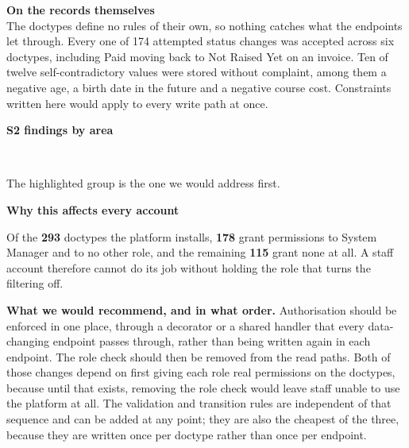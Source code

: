 \documentclass[10pt,a4paper]{article}
\newcommand{\display}{\sffamily}
\newcommand{\code}[1]{{\ttfamily #1}}
\begin{document}
\begin{minipage}[t]{0.55\textwidth}
{\display\small\bfseries\color{accent}On the records themselves}\\[0.15em]
The doctypes define no rules of their own, so nothing catches what the endpoints let through. Every
one of 174 attempted status changes was accepted across six doctypes, including \code{Paid} moving
back to \code{Not Raised Yet} on an invoice. Ten of twelve self-contradictory values were stored
without complaint, among them a negative age, a birth date in the future and a negative course cost.
Constraints written here would apply to every write path at once.
\end{minipage}\hfill
\begin{minipage}[t]{0.41\textwidth}
\vspace{0pt}
{\display\footnotesize\bfseries\color{accent}S2 findings by area}\\[0.35em]
\\[0.6em]
{\scriptsize\color{muted}The highlighted group is the one we would address first.\par}
\vspace{0.5em}
{\display\footnotesize\bfseries\color{accent}Why this affects every account}\\[0.25em]
{\scriptsize Of the \textbf{293} doctypes the platform installs, \textbf{178} grant permissions to
\code{System Manager} and to no other role, and the remaining \textbf{115} grant none at all. A
staff account therefore cannot do its job without holding the role that turns the filtering off.\par}
\end{minipage}

\vspace{0.35em}
\textbf{What we would recommend, and in what order.} Authorisation should be enforced in one
place, through a decorator or a shared handler that every data-changing endpoint passes through,
rather than being written again in each endpoint. The role check should then be removed from the
read paths. Both of those changes depend on first giving each role real permissions on the
doctypes, because until that exists, removing the role check would leave staff unable to use the
platform at all. The validation and transition rules are independent of that sequence and can be
added at any point; they are also the cheapest of the three, because they are written once per
doctype rather than once per endpoint.
\end{document}
